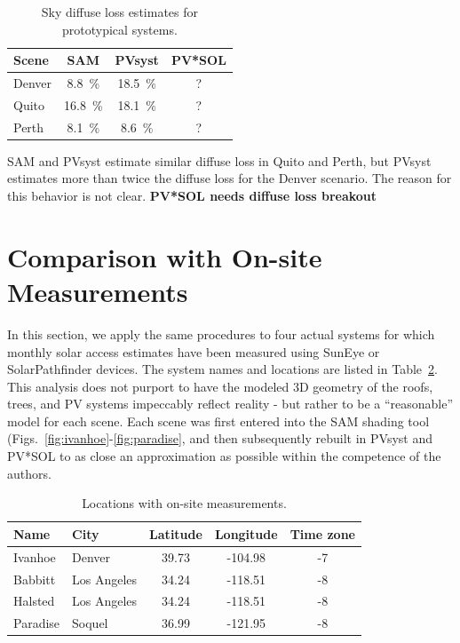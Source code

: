 \documentclass[twocolumn,10pt]{asme2ej}
\begin{document}
\begin{table}[h!]
\begin{center}
\begin{tabular}{lccc}
Scene & SAM & PVsyst & PV*SOL \\
\hline
Denver & 8.8~\% & 18.5~\% & ? \\
Quito  & 16.8~\% & 18.1~\% & ? \\
Perth  & 8.1~\% & 8.6~\% & ? \\
\end{tabular}
\caption{Sky diffuse loss estimates for prototypical systems.}
\label{tab:diffuse_loss}
\end{center}
\end{table}

SAM and PVsyst estimate similar diffuse loss in Quito and Perth, but PVsyst estimates more than twice the diffuse loss for the Denver scenario.  The reason for this behavior is not clear.  \textbf{PV*SOL needs diffuse loss breakout}



\section{Comparison with On-site Measurements}

In this section, we apply the same procedures to four actual systems for which monthly solar access estimates have been measured using SunEye or SolarPathfinder devices.  The system names and locations are listed in Table~\ref{tab:measured_system_names}.  This analysis does not purport to have the modeled 3D geometry of the roofs, trees, and PV systems impeccably reflect reality - but rather to be a ``reasonable'' model for each scene.  Each scene was first entered into the SAM shading tool (Figs.~\ref{fig:ivanhoe}-\ref{fig:paradise}, and then subsequently rebuilt in PVsyst and PV*SOL to as close an approximation as possible within the competence of the authors.

\begin{table}[h!]
\begin{center}
\begin{tabular}{llccc}
Name & City & Latitude & Longitude & Time zone \\
\hline
Ivanhoe & Denver & 39.73 & -104.98 & -7 \\
Babbitt & Los Angeles & 34.24 & -118.51 & -8 \\
Halsted & Los Angeles & 34.24 & -118.51 & -8 \\
Paradise & Soquel & 36.99 & -121.95 & -8 \\
\end{tabular}
\caption{Locations with on-site measurements.}
\label{tab:measured_system_names}
\end{center}
\end{table}
\end{document}
